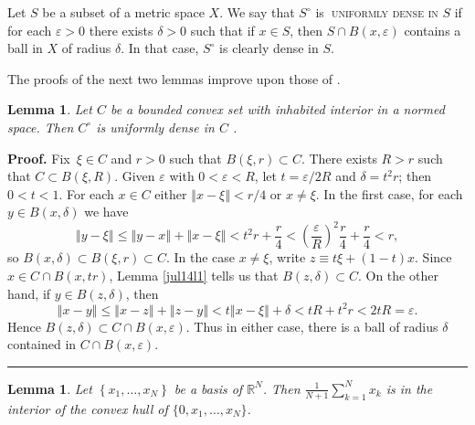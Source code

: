 \documentclass[11pt]{article}%
\newtheorem{lemma}[theorem]{Lemma}
\newenvironment{proof}[1][Proof]{\noindent\textbf{#1.} }{\ \rule{0.5em}{0.5em}}
\begin{document}
%

\medskip


Let $S$ be a subset of a metric space $X$. We say that $S^{\circ}$
is\textbf{\ }\textsc{uniformly dense in} $S$ if for each $\varepsilon>0$ there
exists $\delta>0$ such that if $x\in S$, then $S\cap B(x,\varepsilon)$
contains a ball in $X$ of radius $\delta$. In that case, $S^{\circ}$ is
clearly dense in $S$.

The proofs of the next two lemmas improve upon those of \cite[Lemmas 9 and
2]{Br88}.

\begin{lemma}
\label{0105a2}Let $C$ be a bounded convex set with inhabited interior in a
normed space. Then $C^{\circ}$ is uniformly dense in $C$ \emph{\cite[Lemma
9]{Br88}}.
\end{lemma}

\begin{proof}
\label{ere}Fix\textsf{\ }$\xi\in C$ and $r>0$ such that $B(\xi,r)\subset C$.
There exists $R>r$ such that $C\subset B(\xi,R)$. Given $\varepsilon$ with
$0<\varepsilon<R$, let $t=\varepsilon/2R$ and $\delta=t^{2}r$; then $0<t<1$.
For each $x\in C$ either $\left\Vert x-\xi\right\Vert <r/4$ or $x\neq\xi$. In
the first case, for each $y\in B(x,\delta)$ we have%
\[
\left\Vert y-\xi\right\Vert \leqslant\left\Vert y-x\right\Vert +\left\Vert
x-\xi\right\Vert <t^{2}r+\frac{r}{4}<\left(  \frac{\varepsilon}{R}\right)
^{2}\frac{r}{4}+\frac{r}{4}<r,
\]
so $B(x,\delta)\subset B(\xi,r)\subset C$. In the case $x\neq\xi$, write
$z\equiv t\xi+(1-t)x$. Since $x\in C\cap B(x,tr)$, Lemma \ref{jul14l1} tells
us that $B(z,\delta)\subset C$. On the other hand, if $y\in B(z,\delta)$, then%
\[
\left\Vert x-y\right\Vert \leqslant\left\Vert x-z\right\Vert +\left\Vert
z-y\right\Vert <t\left\Vert x-\xi\right\Vert +\delta<tR+t^{2}r<2tR=\varepsilon
.
\]
Hence $B(z,\delta)\subset C\cap B(x,\varepsilon)$. Thus in either case, there
is a ball of radius $\delta$ contained in $C\cap B(x,\varepsilon)$.
\end{proof}

\begin{lemma}
\label{0105a3}Let $\left\{  x_{1},\ldots,x_{N}\right\}  $ be a basis of
$\mathbb{R}^{N}$. Then $\tfrac{1}{N+1}%
{\textstyle\sum_{k=1}^{N}}
x_{k}$ is in the interior of the convex hull of $\{0,x_{1},\ldots,x_{N}\}$.
\end{lemma}
\end{document}
